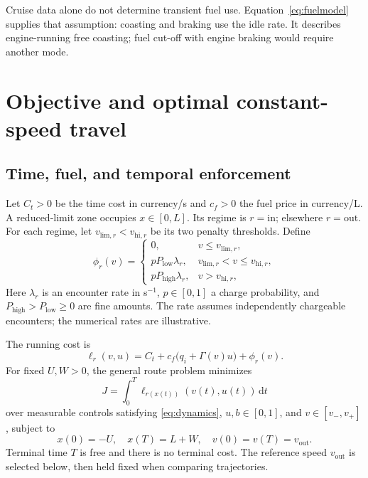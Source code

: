 \documentclass[conference,a4paper]{IEEEtran}
\newcommand{\dd}{\,\mathrm{d}}
\newcommand{\out}{\mathrm{out}}
\newcommand{\inn}{\mathrm{in}}
\begin{document}
Cruise data alone do not determine transient fuel use. Equation~\eqref{eq:fuelmodel} supplies that assumption: coasting and braking use the idle rate. It describes engine-running free coasting; fuel cut-off with engine braking would require another mode.

\section{Objective and optimal constant-speed travel}
\label{sec:objective}
\subsection{Time, fuel, and temporal enforcement}
Let $C_t>0$ be the time cost in currency/s and $c_f>0$ the fuel price in currency/L. A reduced-limit zone occupies $x\in[0,L]$. Its regime is $r=\inn$; elsewhere $r=\out$. For each regime, let $v_{\mathrm{lim},r}<v_{\mathrm{hi},r}$ be its two penalty thresholds. Define
\begin{equation}
\phi_r(v)=
\begin{cases}
0,&v\le v_{\mathrm{lim},r},\\
pP_{\mathrm{low}}\lambda_r,&v_{\mathrm{lim},r}<v\le v_{\mathrm{hi},r},\\
pP_{\mathrm{high}}\lambda_r,&v>v_{\mathrm{hi},r},
\end{cases}
\label{eq:fines}
\end{equation}
Here $\lambda_r$ is an encounter rate in s$^{-1}$, $p\in[0,1]$ a charge probability, and $P_{\mathrm{high}}>P_{\mathrm{low}}\ge0$ are fine amounts. The rate assumes independently chargeable encounters; the numerical rates are illustrative.

The running cost is
\begin{equation}
\ell_r(v,u)=C_t+c_f\bigl(q_i+\Gamma(v)u\bigr)+\phi_r(v).
\label{eq:running}
\end{equation}
For fixed $U,W>0$, the general route problem minimizes
\begin{equation}
J=\int_0^T\ell_{r(x(t))}(v(t),u(t))\dd t
\label{eq:objective}
\end{equation}
over measurable controls satisfying \eqref{eq:dynamics}, $u,b\in[0,1]$, and $v\in[v_-,v_+]$, subject to
\begin{equation}
x(0)=-U,\quad x(T)=L+W,\quad v(0)=v(T)=v_{\out}.
\end{equation}
Terminal time $T$ is free and there is no terminal cost. The reference speed $v_{\out}$ is selected below, then held fixed when comparing trajectories.
\end{document}

